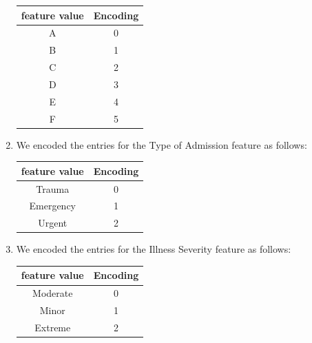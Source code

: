\documentclass[fleqn]{article}
\begin{document}
\begin{enumerate}
            \begin{center}
            \begin{tabular}{ |c|c| } 
             \hline
             feature value & Encoding\\
             \hline
             A & 0 \\ 
             B & 1\\ 
             C & 2\\
             D & 3\\
             E & 4\\
             F & 5\\
             \hline
            \end{tabular}
            \end{center}
            
        \item We encoded the entries for the Type of Admission feature as follows:
            \begin{center}
            \begin{tabular}{ |c|c| } 
             \hline
             feature value & Encoding\\
             \hline
             Trauma & 0 \\ 
             Emergency & 1\\ 
             Urgent & 2\\
             \hline
            \end{tabular}
            \end{center}
            
        \item We encoded the entries for the Illness Severity feature as follows:
            \begin{center}
            \begin{tabular}{ |c|c| } 
             \hline
             feature value & Encoding\\
             \hline
             Moderate & 0 \\ 
             Minor & 1\\ 
             Extreme & 2\\
             \hline
            \end{tabular}
            \end{center}
            

\end{enumerate}
\end{document}

